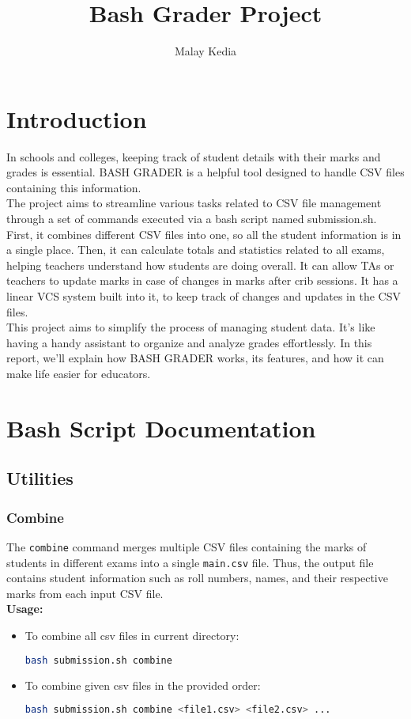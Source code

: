 \documentclass{article}
\title{Bash Grader Project}
\author{Malay Kedia}
\begin{document}
\maketitle

\tableofcontents
\clearpage

\section{Introduction}
In schools and colleges, keeping track of student details with their marks and grades is essential. BASH GRADER is a helpful tool designed to handle CSV files containing this information.\\
The project aims to streamline various tasks related to CSV file management through a set of commands executed via a bash script named submission.sh. First, it combines different CSV files into one, so all the student information is in a single place. Then, it can calculate totals and statistics related to all exams, helping teachers understand how students are doing overall. It can allow TAs or teachers to update marks in case of changes in marks after crib sessions. It has a linear VCS system built into it, to keep track of changes and updates in the CSV files.\\
This project aims to simplify the process of managing student data. It's like having a handy assistant to organize and analyze grades effortlessly. In this report, we'll explain how BASH GRADER works, its features, and how it can make life easier for educators. 

\section{Bash Script Documentation}

\subsection{Utilities}
\subsubsection{Combine}
The \texttt{combine} command merges multiple CSV files containing the marks of students in different exams into a single \texttt{main.csv} file. Thus, the output file contains student information such as roll numbers, names, and their respective marks from each input CSV file.\\
\textbf{Usage:}
\begin{itemize}
\item To combine all csv files in current directory:
\begin{lstlisting}[language=bash]
bash submission.sh combine
\end{lstlisting}
\item To combine given csv files in the provided order:
\begin{lstlisting}[language=bash]
bash submission.sh combine <file1.csv> <file2.csv> ...
\end{lstlisting}
\end{itemize}
\end{document}
